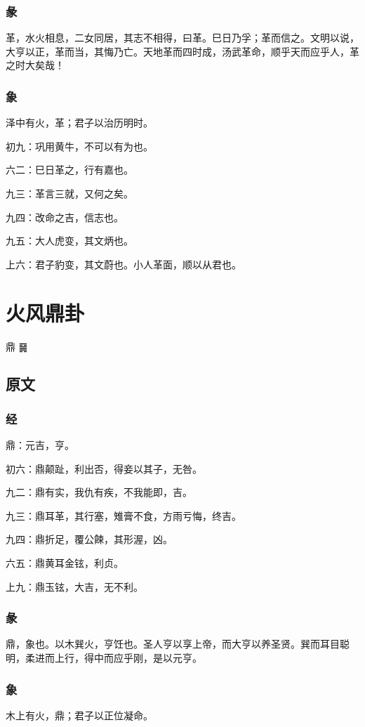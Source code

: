 \documentclass[12pt,oneside]{book}
\begin{document}
\subsection{彖}
革，水火相息，二女同居，其志不相得，曰革。巳日乃孚；革而信之。文明以说，大亨以正，革而当，其悔乃亡。天地革而四时成，汤武革命，顺乎天而应乎人，革之时大矣哉！

\subsection{象}
泽中有火，革；君子以治历明时。

初九：巩用黄牛，不可以有为也。

六二：巳日革之，行有嘉也。

九三：革言三就，又何之矣。

九四：改命之吉，信志也。

九五：大人虎变，其文炳也。

上六：君子豹变，其文蔚也。小人革面，顺以从君也。


\chapter{火风鼎卦}
鼎 {\large ䷱}
\section{原文}

\subsection{经}
鼎：元吉，亨。

初六：鼎颠趾，利出否，得妾以其子，无咎。

九二：鼎有实，我仇有疾，不我能即，吉。

九三：鼎耳革，其行塞，雉膏不食，方雨亏悔，终吉。

九四：鼎折足，覆公餗，其形渥，凶。

六五：鼎黄耳金铉，利贞。

上九：鼎玉铉，大吉，无不利。

\subsection{彖}
鼎，象也。以木巽火，亨饪也。圣人亨以享上帝，而大亨以养圣贤。巽而耳目聪明，柔进而上行，得中而应乎刚，是以元亨。

\subsection{象}
木上有火，鼎；君子以正位凝命。
\end{document}
